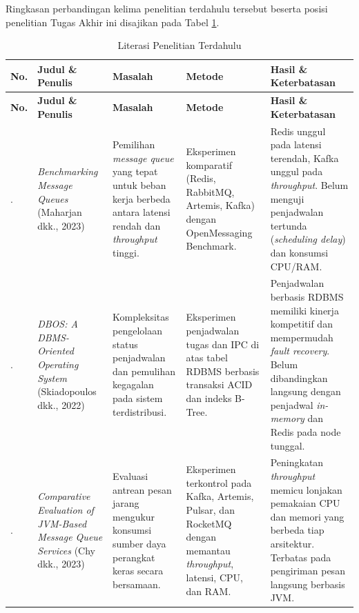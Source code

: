 Ringkasan perbandingan kelima penelitian terdahulu tersebut beserta posisi penelitian Tugas Akhir ini disajikan pada Tabel \ref{table:2.literasi}. \par
{\footnotesize\setlength{\tabcolsep}{4pt}%
\begin{longtable}{|>{\centering\arraybackslash}p{}|>{\raggedright\arraybackslash}p{}|>{\raggedright\arraybackslash}p{}|>{\raggedright\arraybackslash}p{}|>{\raggedright\arraybackslash}p{}|}
	\caption{Literasi Penelitian Terdahulu}
	\label{table:2.literasi}\\
	\hline
	\textbf{No.} & \textbf{Judul \& Penulis} & \textbf{Masalah} & \textbf{Metode} & \textbf{Hasil \& Keterbatasan} \\
	\hline
	\endfirsthead
	\hline
	\textbf{No.} & \textbf{Judul \& Penulis} & \textbf{Masalah} & \textbf{Metode} & \textbf{Hasil \& Keterbatasan} \\
	\hline
	\endhead
	1. & \textit{Benchmarking Message Queues} (Maharjan dkk., 2023) \cite{maharjan2023benchmarking} & Pemilihan \textit{message queue} yang tepat untuk beban kerja berbeda antara latensi rendah dan \textit{throughput} tinggi. & Eksperimen komparatif (Redis, RabbitMQ, Artemis, Kafka) dengan OpenMessaging Benchmark. & Redis unggul pada latensi terendah, Kafka unggul pada \textit{throughput}. Belum menguji penjadwalan tertunda (\textit{scheduling delay}) dan konsumsi CPU/RAM. \\ 
	\hline
	2. & \textit{DBOS: A DBMS-Oriented Operating System} (Skiadopoulos dkk., 2022) \cite{skiadopoulos2022dbos} & Kompleksitas pengelolaan status penjadwalan dan pemulihan kegagalan pada sistem terdistribusi. & Eksperimen penjadwalan tugas dan IPC di atas tabel RDBMS berbasis transaksi ACID dan indeks B-Tree. & Penjadwalan berbasis RDBMS memiliki kinerja kompetitif dan mempermudah \textit{fault recovery}. Belum dibandingkan langsung dengan penjadwal \textit{in-memory} dan Redis pada node tunggal. \\ 
	\hline
	3. & \textit{Comparative Evaluation of JVM-Based Message Queue Services} (Chy dkk., 2023) \cite{chy2023comparative} & Evaluasi antrean pesan jarang mengukur konsumsi sumber daya perangkat keras secara bersamaan. & Eksperimen terkontrol pada Kafka, Artemis, Pulsar, dan RocketMQ dengan memantau \textit{throughput}, latensi, CPU, dan RAM. & Peningkatan \textit{throughput} memicu lonjakan pemakaian CPU dan memori yang berbeda tiap arsitektur. Terbatas pada pengiriman pesan langsung berbasis JVM. \\ 

\end{longtable}}
